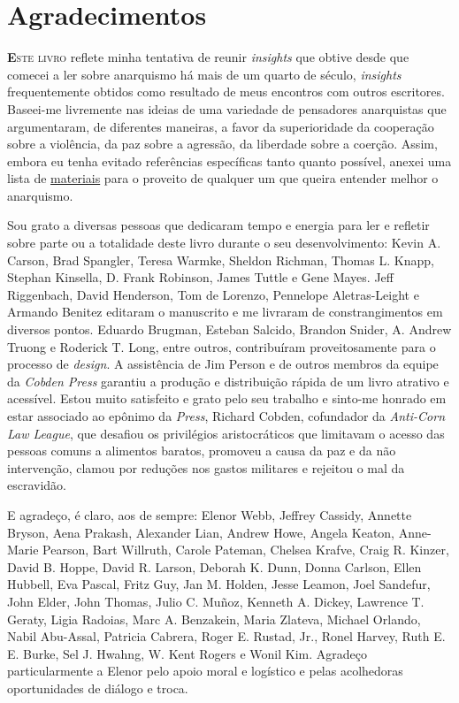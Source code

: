 
\chapter{Agradecimentos}

\lettrine[lines=2]{\textcolor{LettrineColor}{\textbf{E}}}{ste livro} reflete minha tentativa de reunir \emph{insights} que obtive desde que comecei a ler sobre anarquismo há mais de um quarto de século, \emph{insights} frequentemente obtidos como resultado de meus encontros com outros escritores. Baseei-me livremente nas ideias de uma variedade de pensadores anarquistas que argumentaram, de diferentes maneiras, a favor da superioridade da cooperação sobre a violência, da paz sobre a agressão, da liberdade sobre a coerção. Assim, embora eu tenha evitado referências específicas tanto quanto possível, anexei uma lista de \hyperref[chap:rec]{materiais} para o proveito de qualquer um que queira entender melhor o anarquismo.

Sou grato a diversas pessoas que dedicaram tempo e energia para ler e refletir sobre parte ou a totalidade deste livro durante o seu desenvolvimento: Kevin A. Carson, Brad Spangler, Teresa Warmke, Sheldon Richman, Thomas L. Knapp, Stephan Kinsella, D. Frank Robinson, James Tuttle e Gene Mayes. Jeff Riggenbach, David Henderson, Tom de Lorenzo, Pennelope Aletras-Leight e Armando Benitez editaram o manuscrito e me livraram de constrangimentos em diversos pontos. Eduardo Brugman, Esteban Salcido, Brandon Snider, A. Andrew Truong e Roderick T. Long, entre outros, contribuíram proveitosamente para o processo de \emph{design}. A assistência de Jim Person e de outros membros da equipe da \emph{Cobden Press} garantiu a produção e distribuição rápida de um livro atrativo e acessível. Estou muito satisfeito e grato pelo seu trabalho e sinto-me honrado em estar associado ao epônimo da \emph{Press}, Richard Cobden, cofundador da \emph{Anti-Corn Law League}, que desafiou os privilégios aristocráticos que limitavam o acesso das pessoas comuns a alimentos baratos, promoveu a causa da paz e da não intervenção, clamou por reduções nos gastos militares e rejeitou o mal da escravidão.

E agradeço, é claro, aos de sempre: Elenor Webb, Jeffrey Cassidy, Annette Bryson, Aena Prakash, Alexander Lian, Andrew Howe, Angela Keaton, Anne-Marie Pearson, Bart Willruth, Carole Pateman, Chelsea Krafve, Craig R. Kinzer, David B. Hoppe, David R. Larson, Deborah K. Dunn, Donna Carlson, Ellen Hubbell, Eva Pascal, Fritz Guy, Jan M. Holden, Jesse Leamon, Joel Sandefur, John Elder, John Thomas, Julio C. Muñoz, Kenneth A. Dickey, Lawrence T. Geraty, Ligia Radoias, Marc A. Benzakein, Maria Zlateva, Michael Orlando, Nabil Abu-Assal, Patricia Cabrera, Roger E. Rustad, Jr., Ronel Harvey, Ruth E. E. Burke, Sel J. Hwahng, W. Kent Rogers e Wonil Kim. Agradeço particularmente a Elenor pelo apoio moral e logístico e pelas acolhedoras oportunidades de diálogo e troca.

